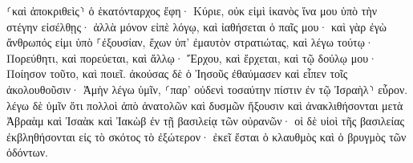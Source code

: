 \documentclass{openreader}
\begin{document}
⸂καὶ ἀποκριθεὶς⸃ ὁ ἑκατόνταρχος ἔφη· Κύριε, οὐκ εἰμὶ ἱκανὸς ἵνα μου ὑπὸ τὴν στέγην εἰσέλθῃς· ἀλλὰ μόνον εἰπὲ λόγῳ, καὶ ἰαθήσεται ὁ παῖς μου· 
καὶ γὰρ ἐγὼ ἄνθρωπός εἰμι ὑπὸ ⸀ἐξουσίαν, ἔχων ὑπ’ ἐμαυτὸν στρατιώτας, καὶ λέγω τούτῳ· Πορεύθητι, καὶ πορεύεται, καὶ ἄλλῳ· Ἔρχου, καὶ ἔρχεται, καὶ τῷ δούλῳ μου· Ποίησον τοῦτο, καὶ ποιεῖ. 
ἀκούσας δὲ ὁ Ἰησοῦς ἐθαύμασεν καὶ εἶπεν τοῖς ἀκολουθοῦσιν· Ἀμὴν λέγω ὑμῖν, ⸂παρ’ οὐδενὶ τοσαύτην πίστιν ἐν τῷ Ἰσραὴλ⸃ εὗρον. 
λέγω δὲ ὑμῖν ὅτι πολλοὶ ἀπὸ ἀνατολῶν καὶ δυσμῶν ἥξουσιν καὶ ἀνακλιθήσονται μετὰ Ἀβραὰμ καὶ Ἰσαὰκ καὶ Ἰακὼβ ἐν τῇ βασιλείᾳ τῶν οὐρανῶν· 
οἱ δὲ υἱοὶ τῆς βασιλείας ἐκβληθήσονται εἰς τὸ σκότος τὸ ἐξώτερον· ἐκεῖ ἔσται ὁ κλαυθμὸς καὶ ὁ βρυγμὸς τῶν ὀδόντων. 
\end{document}
